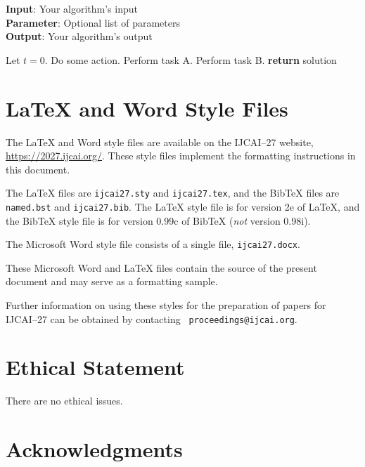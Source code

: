 \documentclass{article}
\begin{document}
\begin{algorithm}[tb]
    \caption{Example algorithm}
    \label{alg:algorithm}
    \textbf{Input}: Your algorithm's input\\
    \textbf{Parameter}: Optional list of parameters\\
    \textbf{Output}: Your algorithm's output
    \begin{algorithmic}[1] %
        \STATE Let $t=0$.
        \STATE Do some action.
        \STATE Perform task A.
        \ELSE
        \STATE Perform task B.
        \ENDIF
        \ENDWHILE
        \STATE \textbf{return} solution
    \end{algorithmic}
\end{algorithm}

\section{\LaTeX{} and Word Style Files}\label{stylefiles}

The \LaTeX{} and Word style files are available on the IJCAI--27
website, \url{https://2027.ijcai.org/}.
These style files implement the formatting instructions in this
document.

The \LaTeX{} files are {\tt ijcai27.sty} and {\tt ijcai27.tex}, and
the Bib\TeX{} files are {\tt named.bst} and {\tt ijcai27.bib}. The
\LaTeX{} style file is for version 2e of \LaTeX{}, and the Bib\TeX{}
style file is for version 0.99c of Bib\TeX{} ({\em not} version
0.98i). 

The Microsoft Word style file consists of a single file, {\tt ijcai27.docx}. 

These Microsoft Word and \LaTeX{} files contain the source of the
present document and may serve as a formatting sample.

Further information on using these styles for the preparation of
papers for IJCAI--27 can be obtained by contacting {\tt
        proceedings@ijcai.org}.

\appendix

\section*{Ethical Statement}

There are no ethical issues.

\section*{Acknowledgments}
\end{document}
